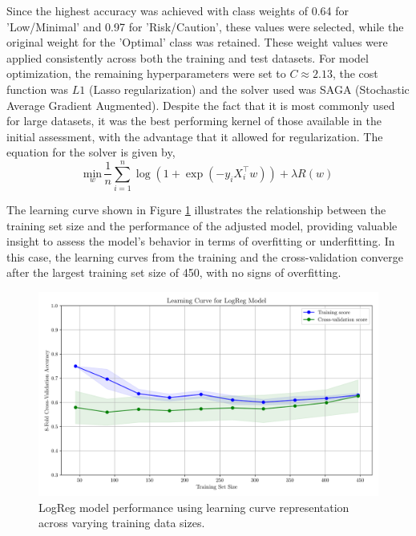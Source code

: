 \documentclass[conference]{IEEEtran}
\begin{document}
Since the highest accuracy was achieved with class weights of 0.64 for 'Low/Minimal' and 0.97 for 'Risk/Caution', these values were selected, while the original weight for the 'Optimal' class was retained. These weight values were applied consistently across both the training and test datasets. For model optimization, the remaining hyperparameters were set to $C \approx 2.13$, the cost function was $L1$ (Lasso regularization) and the solver used was SAGA (Stochastic Average Gradient Augmented). Despite the fact that it is most commonly used for large datasets, it was the best performing kernel of those available in the initial assessment, with the advantage that it allowed for regularization. The equation for the solver is given by,
\begin{equation*}
\underset{w}{\text{min}} \, \frac{1}{n} \sum_{i=1}^{n} \log\left(1 + \exp\left(-y_i X_i^\top w\right)\right) + \lambda R(w)
\end{equation*} %

The learning curve shown in Figure \ref{lcLogReg} illustrates the relationship between the training set size and the performance of the adjusted model, providing valuable insight to assess the model's behavior in terms of overfitting or underfitting. In this case, the learning curves from the training and the cross-validation converge after the largest training set size of 450, with no signs of overfitting.

\begin{figure}[H]
    \centering
    \includegraphics[width=1\linewidth]{assets/LOGR_lercurve.png}
    \caption{LogReg model performance using learning curve representation across varying training data sizes.}
    \label{lcLogReg}
\end{figure} %
\end{document}
